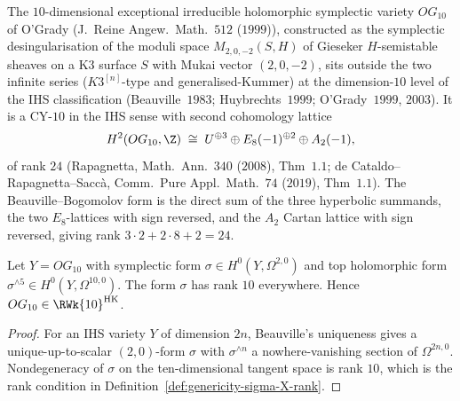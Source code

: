 The $10$-dimensional exceptional irreducible holomorphic symplectic
variety $OG_{10}$ of O'Grady (J.\ Reine Angew.\ Math.~$512$
($1999$)), constructed as the symplectic desingularisation of the
moduli space $M_{2, 0, -2}(S, H)$ of Gieseker $H$-semistable sheaves
on a K$3$ surface $S$ with Mukai vector $(2, 0, -2)$, sits outside
the two infinite series ($K3^{[n]}$-type and generalised-Kummer) at
the dimension-$10$ level of the IHS classification
(Beauville~$1983$; Huybrechts~$1999$; O'Grady~$1999$, $2003$). It is
a CY-$10$ in the IHS sense with second cohomology lattice
\[
 H^2(OG_{10}, \Z) \;\cong\; U^{\oplus 3} \oplus E_8(-1)^{\oplus 2}
 \oplus A_2(-1),
\]
of rank $24$ (Rapagnetta, Math.\ Ann.~$340$ ($2008$), Thm~$1.1$;
de Cataldo--Rapagnetta--Sacc\`a, Comm.\ Pure Appl.\ Math.~$74$
($2019$), Thm~$1.1$). The Beauville--Bogomolov form is the direct
sum of the three hyperbolic summands, the two $E_8$-lattices with
sign reversed, and the $A_2$ Cartan lattice with sign reversed,
giving rank $3 \cdot 2 + 2 \cdot 8 + 2 = 24$.

\begin{lemma}
\label{lem:og-10-weight-5-kapranov}
%
Let $Y = OG_{10}$ with symplectic form $\sigma \in H^0(Y,
\Omega^{2,0})$ and top holomorphic form
$\sigma^{\wedge 5} \in H^0(Y, \Omega^{10,0})$. The form \(\sigma\) has
rank \(10\) everywhere. Hence \(OG_{10} \in \RWk{10}^{\mathrm{HK}}\).
\end{lemma}

\begin{proof}
For an IHS variety \(Y\) of dimension \(2n\), Beauville's uniqueness gives
a unique-up-to-scalar \((2,0)\)-form \(\sigma\) with \(\sigma^{\wedge n}\)
a nowhere-vanishing section of \(\Omega^{2n,0}\). Nondegeneracy of
\(\sigma\) on the ten-dimensional tangent space is rank \(10\), which is
the rank condition in Definition~\ref{def:genericity-sigma-X-rank}.
\end{proof}

